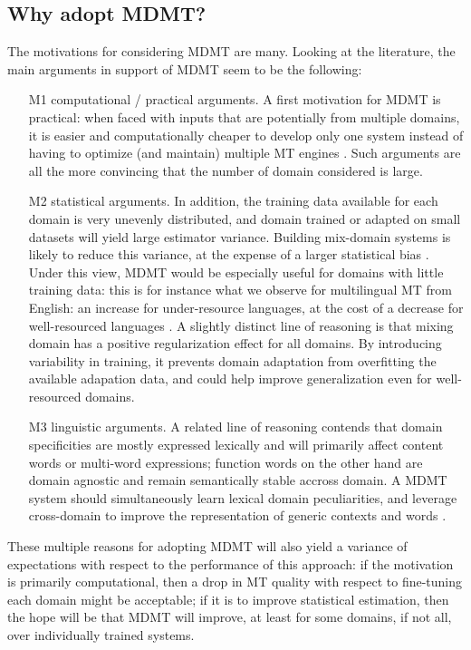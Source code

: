 \documentclass[11pt]{article}
\begin{document}
\subsection{Why adopt MDMT? \label{ssec:whymdmt}}
The motivations for considering MDMT are many. Looking at the literature, the main arguments in support of MDMT seem to be the following:
\begin{enumerate}
\item[M1] computational / practical arguments. A first motivation for MDMT is practical: when faced with inputs that are potentially from multiple domains, it is easier and computationally cheaper to develop only one system instead of having to optimize (and maintain) multiple MT engines \cite{Sennrich13multidomain}. Such arguments are all the more convincing that the number of domain considered is large.
  
\item[M2] statistical arguments. In addition, the training data available for each domain is very unevenly distributed, and domain trained or adapted on small datasets will yield large estimator variance. Building mix-domain systems is likely to reduce this variance, at the expense of a larger statistical bias \cite{Clark12onesystem}. Under this view, MDMT would be especially useful for domains with little training data: this is for instance what we observe for multilingual MT from English: an increase for under-resource languages, at the cost of a decrease for well-resourced languages \cite{Massively paper}. A slightly distinct line of reasoning is that mixing domain has a positive regularization effect for all domains. By introducing variability in training, it prevents domain adaptation from overfitting the available adapation data, and could help improve generalization even for well-resourced domains.
  
\item[M3] linguistic arguments. A related line of reasoning contends that domain specificities are mostly expressed lexically and will primarily affect content words or multi-word expressions; function words on the other hand are domain agnostic and remain semantically stable accross domain. A MDMT system should simultaneously learn lexical domain peculiarities, and leverage cross-domain to improve the representation of generic contexts and words \cite{Zeng18multidomain,Pham19generic}.
\end{enumerate}

These multiple reasons for adopting MDMT will also yield a variance of expectations with respect to the performance of this approach: if the motivation is primarily computational, then a drop in MT quality with respect to fine-tuning each domain might be acceptable; if it is to improve statistical estimation, then the hope will be that MDMT will improve, at least for some domains, if not all, over individually trained systems.
\end{document}
